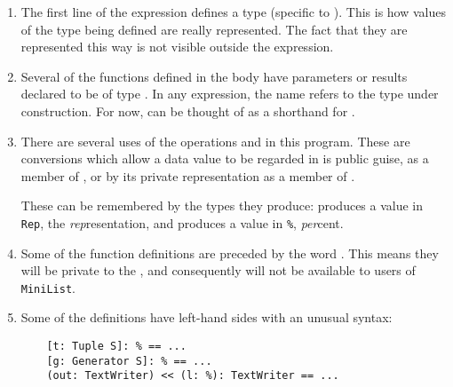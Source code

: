 \begin{enumerate}
\item 
The first line of  the 
expression defines a type  (specific to ).
This is how values of the type being defined are really represented.
The fact that they are represented this way is not visible outside
the  expression.

\item
Several of the functions defined in the body have parameters or
results declared to be of type \ttin{\%}.
In any  expression, the name \ttin{\%} refers to the type
under construction.  
For now, \ttin{\%} can be thought of as a shorthand for .

\item
There are several uses of the operations  and 
in this program.  
These are conversions which allow a data value to be regarded
in is public guise, as a member of \ttin{\%}, or by its private
representation as a member of .


These can be remembered by the types they produce:   produces
a value in \verb"Rep", the {\em rep\/}resentation,
and  produces a value in \verb"%", {\em per\/}cent.

\item
Some of the function definitions are preceded by the word .
This means they will be private to the , and consequently
will not be available to users of \verb"MiniList".

\item
Some of the definitions have left-hand sides with an unusual syntax:

\begin{verbatim}
    [t: Tuple S]: % == ...
    [g: Generator S]: % == ...
    (out: TextWriter) << (l: %): TextWriter == ...
\end{verbatim}


\end{enumerate}
